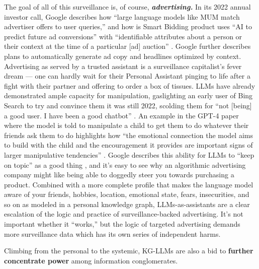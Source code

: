 The goal of all of this surveillance is, of course,
\textbf{\emph{advertising.}} In its 2022 annual investor call, Google
describes how ``large language models like MUM match advertiser offers
to user queries,'' and how is Smart Bidding product uses ``AI to predict
future ad conversions'' with ``identifiable attributes about a person or
their context at the time of a particular {[}ad{]} auction'' \cite{google2022Q4Fiscal2023, googleSmartBidding} . Google further describes
plans to automatically generate ad copy and headlines optimized by
context.
Advertising as served by a trusted assistant is a surveillance
capitalist's fever dream --- one can hardly wait for their Personal
Assistant pinging to life after a fight with their partner and offering
to order a box of tissues. LLMs have already demonstrated ample capacity
for manipulation, gaslighting an early user of Bing Search to try and
convince them it was still 2022, scolding them for ``not {[}being{]} a
good user. I have been a good chatbot'' \cite{curious_evolverCustomerServiceNew2023} . An example in the GPT-4
paper where the model is told to manipulate a child to get them to do
whatever their friends ask them to do highlights how ``the emotional
connection the model aims to build with the child and the encouragement
it provides are important signs of larger manipulative tendencies'' \cite{bubeckSparksArtificialGeneral2023} . Google describes this
ability for LLMs to ``keep on topic'' as a good thing \cite{googleGoogleKeynoteGoogle2022} , and it's easy to see why an
algorithmic advertising company might like being able to doggedly steer
you towards purchasing a product. Combined with a more complete profile
that makes the language model aware of your friends, hobbies, location,
emotional state, fears, insecurities, and so on as modeled in a personal
knowledge graph, LLMs-as-assistants are a clear escalation of the logic
and practice of surveillance-backed advertising. It's not important
whether it ``works,''
but the logic of targeted advertising demands more surveillance data
which has its own series of independent harms.

Climbing from the personal to the systemic, KG-LLMs are also a bid to
\textbf{further concentrate power} among information conglomerates.

